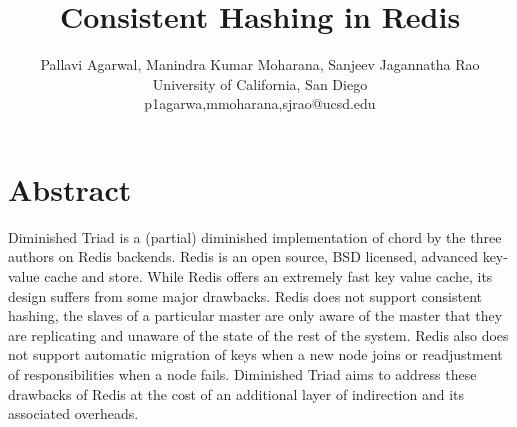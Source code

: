 \documentclass[10pt,twocolumn,letterpaper]{article}
\begin{document}
\title{Consistent Hashing in Redis}

\author{Pallavi Agarwal, Manindra Kumar Moharana, Sanjeev Jagannatha Rao\\
University of California, San Diego\\
\small p1agarwa,mmoharana,sjrao@ucsd.edu}



\maketitle


\section{Abstract}
Diminished Triad is a (partial) diminished implementation of chord by the three authors on Redis backends. Redis is an open source, BSD licensed, advanced key-value cache and store.
While Redis offers an extremely fast key value cache, its design suffers from some major drawbacks. Redis does not support consistent hashing, the slaves of a particular master are only aware of the master that they are replicating and unaware of the state of the rest of the system. Redis also does not support automatic migration of keys when a new node joins or readjustment of responsibilities when a node fails. Diminished Triad aims to address these drawbacks of Redis at the cost of an additional layer of indirection and its associated overheads.
\end{document}
